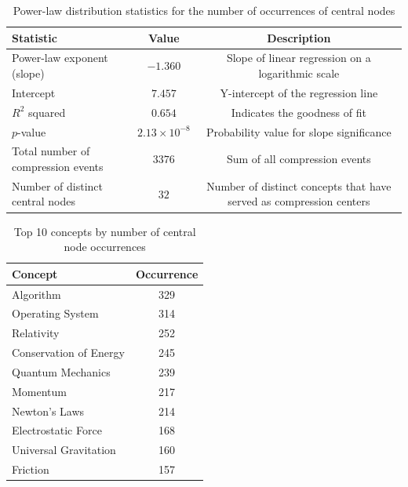 \documentclass[10pt,onecolumn]{article}
\begin{document}
\begin{table}[H]
\footnotesize
\centering
\caption{Power-law distribution statistics for the number of occurrences of central nodes}
\label{tab:app_zipf_center}
\begin{tabular}{lcc}
\toprule
\textbf{Statistic} & \textbf{Value} & \textbf{Description} \\
\midrule
Power-law exponent (slope) & $-1.360$ & Slope of linear regression on a logarithmic scale \\
Intercept & $7.457$ & Y-intercept of the regression line \\
$R^2$ squared & $0.654$ & Indicates the goodness of fit \\
$p$-value & $2.13\times10^{-8}$ & Probability value for slope significance \\
Total number of compression events & $3376$ & Sum of all compression events \\
Number of distinct central nodes & $32$ & Number of distinct concepts that have served as compression centers \\
\bottomrule
\end{tabular}
\end{table}

\begin{table}[H]
\footnotesize
\centering
\caption{Top 10 concepts by number of central node occurrences}
\label{tab:app_zipf_center_top10}
\begin{tabular}{lc}
\toprule
\textbf{Concept} & \textbf{Occurrence} \\
\midrule
Algorithm & 329 \\
Operating System & 314 \\
Relativity & 252 \\
Conservation of Energy & 245 \\
Quantum Mechanics & 239 \\
Momentum & 217 \\
Newton's Laws & 214 \\
Electrostatic Force & 168 \\
Universal Gravitation & 160 \\
Friction & 157 \\
\bottomrule
\end{tabular}
\end{table}
\end{document}
